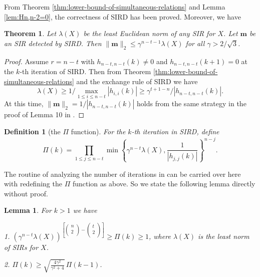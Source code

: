 \documentclass{sig-alternate}
\newtheorem{lem}[theorem]{Lemma}
\newtheorem{thm}[theorem]{Theorem}
\newtheorem{defn}[theorem]{Definition}
\numberwithin{theorem}{section} \numberwithin{equation}{section}
\begin{document}
From Theorem \ref{thm:lower-bound-of-simultaneous-relations} and
Lemma \ref{lem:Hn,n-2=0}, the correctness of SIRD has been proved.
Moreover, we have

\begin{thm}\label{thm:upper-bound-for-SIRs}
Let $\lambda(X)$ be the least Euclidean norm of any SIR for $X$. Let
$\mathbf{m}$  be an SIR detected by SIRD. Then
$\|\mathbf{m}\|_2\leq\gamma^{n-t-1}\lambda(X)$ for all
$\gamma>2/\sqrt{3}$.
\end{thm}
\begin{proof}
Assume $r=n-t$ with $h_{n-t,n-t}(k)\neq 0$ and $h_{n-t,n-t}(k+1)=0$
at the $k$-th iteration of SIRD. Then from Theorem
\ref{thm:lower-bound-of-simultaneous-relations} and the exchange
rule of SIRD we have
\[
\lambda(X)\geq 1/\max_{1\leq i\leq
n-t}|h_{i,i}(k)|\geq\gamma^{t+1-n}/|h_{n-t,n-t}(k)|.
\] At this time, $\|\mathbf{m}\|_2=1/|h_{n-t,n-t}(k)|$ holds from
the same strategy in the proof of Lemma 10 in \cite{FBA1999}.
\end{proof}
\begin{defn}[the $\Pi$ function]\label{def:Pi-function}
For the $k$-th iteration in SIRD, define
\[
\Pi(k) = \prod_{1\leq j\leq n-t} \min\left\{\gamma^{n-t}\lambda(X),
\frac{1}{\left|h_{j,j}(k)\right|}\right\}^{n-j}.
\]
\end{defn}

The routine of analyzing the number of iterations in \cite{FBA1999}
can be carried over here with redefining the $\Pi$ function as
above. So we state the following lemma directly without proof.

\begin{lem}\label{lem:Pi-function}
For $k>1$ we have


1. $\left(\gamma^{n-t}\lambda(X)\right)^{\left[\left(
                                                          \begin{matrix}
                                                            n \\
                                                            2 \\
                                                          \end{matrix}
                                                        \right)-\left(
                                                          \begin{matrix}
                                                            t \\
                                                            2 \\
                                                          \end{matrix}
                                                        \right)
\right]}\geq\Pi(k)\geq 1$, where $\lambda(X)$ is the least norm of
SIRs for $X$.


2. $\Pi(k)\geq \sqrt{\frac{4\gamma^2}{\gamma^2+4}}\, \Pi(k-1)$.
\end{lem}
\end{document}
